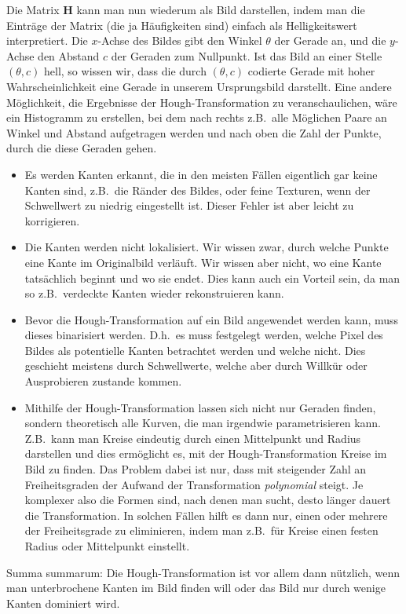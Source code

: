 Die Matrix $ \mathbf{H} $ kann man nun wiederum als Bild darstellen, indem man die Einträge der
Matrix (die ja Häufigkeiten sind) einfach als Helligkeitswert interpretiert. Die $ x $-Achse des
Bildes gibt den Winkel $ \theta $ der Gerade an, und die $ y $-Achse den Abstand $ c $ der Geraden 
zum Nullpunkt. Ist das Bild an einer Stelle $ (\theta, c) $ hell, so wissen wir, dass die durch
$ (\theta, c) $ codierte Gerade mit hoher Wahrscheinlichkeit eine Gerade in unserem Ursprungsbild
darstellt. Eine andere Möglichkeit, die Ergebnisse der Hough-Transformation zu veranschaulichen,
wäre ein Histogramm zu erstellen, bei dem nach rechts z.B.\ alle Möglichen Paare an Winkel und
Abstand aufgetragen werden und nach oben die Zahl der Punkte, durch die diese Geraden gehen.

\begin{remark} \leavevmode
\begin{itemize}
\item Es werden Kanten erkannt, die in den meisten Fällen eigentlich gar keine Kanten sind, z.B.\ 
  die Ränder des Bildes, oder feine Texturen, wenn der Schwellwert zu niedrig eingestellt ist. 
  Dieser Fehler ist aber leicht zu korrigieren.
\item Die Kanten werden nicht lokalisiert. Wir wissen zwar, durch welche Punkte eine Kante im
  Originalbild verläuft. Wir wissen aber nicht, wo eine Kante tatsächlich beginnt und wo sie endet.
  Dies kann auch ein Vorteil sein, da man so z.B.\ verdeckte Kanten wieder rekonstruieren kann.
\item Bevor die Hough-Transformation auf ein Bild angewendet werden kann, muss dieses binarisiert
  werden. D.h.\ es muss festgelegt werden, welche Pixel des Bildes als potentielle Kanten
  betrachtet werden und welche nicht. Dies geschieht meistens durch Schwellwerte, welche aber durch
  Willkür oder Ausprobieren zustande kommen.
\item Mithilfe der Hough-Transformation lassen sich nicht nur Geraden finden, sondern theoretisch
  alle Kurven, die man irgendwie parametrisieren kann. Z.B.\ kann man Kreise eindeutig durch
  einen Mittelpunkt und Radius darstellen und dies ermöglicht es, mit der Hough-Transformation 
  Kreise im Bild zu finden. Das Problem dabei ist nur, dass mit steigender Zahl an Freiheitsgraden 
  der Aufwand der Transformation \emph{polynomial} steigt. Je komplexer also die Formen sind,
  nach denen man sucht, desto länger dauert die Transformation. In solchen Fällen hilft es dann nur,
  einen oder mehrere der Freiheitsgrade zu eliminieren, indem man z.B.\ für Kreise einen festen
  Radius oder Mittelpunkt einstellt.
\end{itemize}
Summa summarum: Die Hough-Transformation ist vor allem dann nützlich, wenn man unterbrochene
Kanten im Bild finden will oder das Bild nur durch wenige Kanten dominiert wird.
\end{remark}

